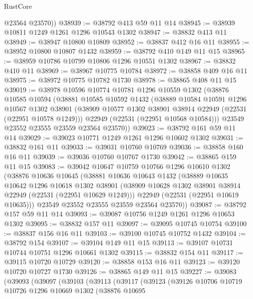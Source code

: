 \begin{lexlean}{RustCore}
\begin{coremodule}
        @23564
        @23570))
@38939 := @38792 @413 @59 @11 @14
@38945 := @38939 @10811 @1249 @1261 @1296 @10543 @1302
@38947 := @38832 @413 @11
@38949 := @38947 @10800 @10809
@38952 := @38837 @412 @16 @11
@38955 := @38952 @10800 @10807 @1432
@38959 := @38792 @410 @149 @11 @15
@38965 := @38959 @10786 @10799 @10806 @1296 @10551 @1302
@38967 := @38832 @410 @11
@38969 := @38967 @10775 @10784
@38972 := @38858 @409 @16 @11
@38975 := @38972 @10775 @10782 @1730
@38978 := @38865 @408 @11 @15
@39019 := @38978
    @10596
    @10774
    @10781
    @1296
    @10559
    @1302
    (@38876
      @10585
      @10594
      (@38881
        @10585
        @10592
        @1432
        (@38889
          @10584
          @10591
          @1296
          @10567
          @1302
          @38901
          (@38909 @10577 @1302 @38901 @38914 @22949 (@22531 (@22951 @10578 @1249)))
          @22949
          (@22531 (@22951 @10568 @10584)))
        @23549
        @23552
        @23555
        @23559
        @23564
        @23570))
@39023 := @38792 @161 @59 @11 @14
@39029 := @39023 @10771 @1249 @1261 @1296 @10602 @1302
@39031 := @38832 @161 @11
@39033 := @39031 @10760 @10769
@39036 := @38858 @160 @16 @11
@39039 := @39036 @10760 @10767 @1730
@39042 := @38865 @159 @11 @15
@39083 := @39042
    @10647
    @10759
    @10766
    @1296
    @10610
    @1302
    (@38876
      @10636
      @10645
      (@38881
        @10636
        @10643
        @1432
        (@38889
          @10635
          @10642
          @1296
          @10618
          @1302
          @38901
          (@38909 @10628 @1302 @38901 @38914 @22949 (@22531 (@22951 @10629 @1249)))
          @22949
          (@22531 (@22951 @10619 @10635)))
        @23549
        @23552
        @23555
        @23559
        @23564
        @23570))
@39087 := @38792 @157 @59 @11 @14
@39093 := @39087 @10756 @1249 @1261 @1296 @10653 @1302
@39095 := @38832 @157 @11
@39097 := @39095 @10745 @10754
@39100 := @38837 @156 @16 @11
@39103 := @39100 @10745 @10752 @1432
@39104 := @38792 @154
@39107 := @39104 @149 @11 @15
@39113 := @39107 @10731 @10744 @10751 @1296 @10661 @1302
@39115 := @38832 @154 @11
@39117 := @39115 @10720 @10729
@39120 := @38858 @153 @16 @11
@39123 := @39120 @10720 @10727 @1730
@39126 := @38865 @149 @11 @15
@39227 := @39083
    (@39093
      (@39097
        (@39103
          (@39113
            (@39117
              (@39123
                (@39126
                  @10706
                  @10719
                  @10726
                  @1296
                  @10669
                  @1302
                  (@38876
                    @10695

\end{coremodule}
\end{lexlean}

